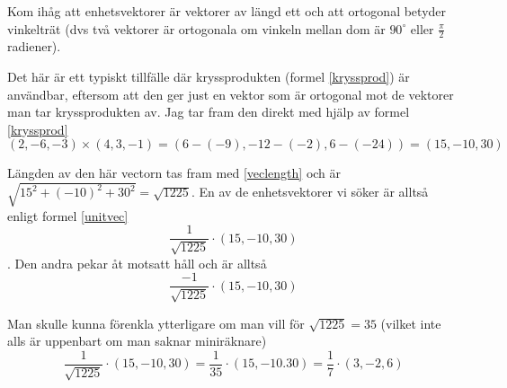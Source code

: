 \documentclass[../main.tex]{subfiles}
\begin{document}
\begin{solution}{5}
Kom ihåg att enhetsvektorer är vektorer av längd ett och att ortogonal betyder vinkelträt (dvs två vektorer är ortogonala om vinkeln mellan dom är $90^\circ$ eller $\frac{\pi}{2}$ radiener).

Det här är ett typiskt tillfälle där kryssprodukten (formel \ref{kryssprod}) är användbar, eftersom att den ger just en vektor som är ortogonal mot de vektorer man tar kryssprodukten av. Jag tar fram den direkt med hjälp av formel \ref{kryssprod}
\[(2, -6, -3)\times (4, 3, -1) = (6 - (-9), -12 - (-2), 6 - (-24)) = (15, -10, 30)\]

Längden av den här vectorn tas fram med \ref{veclength} och är \(\sqrt{15^2 + (-10)^2 + 30^2} = \sqrt{1225}\). En av de enhetsvektorer vi söker är alltså enligt formel \ref{unitvec} 
\[\frac{1}{\sqrt{1225}}\cdot(15, -10, 30)\].
Den andra pekar åt motsatt håll och är alltså 
\[\frac{-1}{\sqrt{1225}}\cdot(15, -10, 30)\]

Man skulle kunna förenkla ytterligare om man vill för $\sqrt{1225} = 35$ (vilket inte alls är uppenbart om man saknar miniräknare)
\[\frac{1}{\sqrt{1225}}\cdot(15, -10, 30) = \frac{1}{35}\cdot(15, -10. 30) = \frac{1}{7}\cdot(3, -2, 6)\]
\end{solution}
\end{document}
